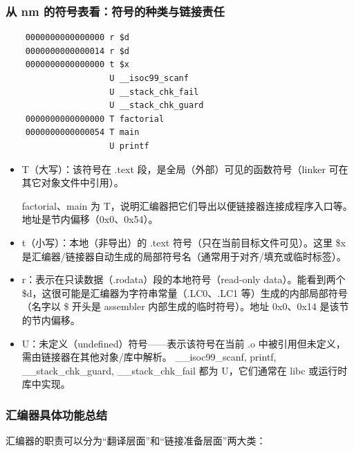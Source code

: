 \documentclass[a4paper]{article}
\begin{document}
\subsubsection{从 nm 的符号表看：符号的种类与链接责任}
\begin{lstlisting}
	0000000000000000 r $d
	0000000000000014 r $d
	0000000000000000 t $x
					 U __isoc99_scanf
				     U __stack_chk_fail
					 U __stack_chk_guard
	0000000000000000 T factorial
	0000000000000054 T main
					 U printf
\end{lstlisting}
\begin{itemize}
	\item T（大写）：该符号在 .text 段，是全局（外部）可见的函数符号（linker 可在其它对象文件中引用）。
	
	factorial、main 为 T，说明汇编器把它们导出以便链接器连接成程序入口等。地址是节内偏移（0x0、0x54）。
	\item t（小写）：本地（非导出）的 .text 符号（只在当前目标文件可见）。这里 \$x 是汇编器/链接器自动生成的局部符号名（通常用于对齐/填充或临时标签）。
	\item r：表示在只读数据（.rodata）段的本地符号（read-only data）。能看到两个 \$d，这很可能是汇编器为字符串常量（.LC0、.LC1 等）生成的内部局部符号（名字以 \$ 开头是 assembler 内部生成的临时符号）。地址 0x0、0x14 是该节的节内偏移。
	\item U：未定义（undefined）符号——表示该符号在当前 .o 中被引用但未定义，需由链接器在其他对象/库中解析。 \_\_isoc99\_scanf, printf, \_\_stack\_chk\_guard, \_\_stack\_chk\_fail 都为 U，它们通常在 libc 或运行时库中实现。
\end{itemize}

\subsubsection{汇编器具体功能总结}
汇编器的职责可以分为“翻译层面”和“链接准备层面”两大类：
\end{document}
